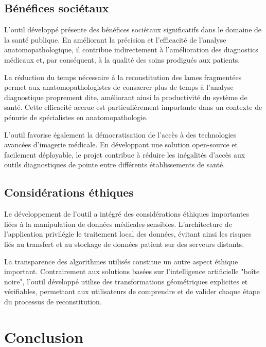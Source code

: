 \documentclass[12pt,a4paper]{report}
\let\oldchapter\chapter
\renewcommand{\chapter}{\clearpage\oldchapter}
\begin{document}
\section{Bénéfices sociétaux}

L'outil développé présente des bénéfices sociétaux significatifs dans le domaine de la santé publique. En améliorant la précision et l'efficacité de l'analyse anatomopathologique, il contribue indirectement à l'amélioration des diagnostics médicaux et, par conséquent, à la qualité des soins prodigués aux patients.

La réduction du temps nécessaire à la reconstitution des lames fragmentées permet aux anatomopathologistes de consacrer plus de temps à l'analyse diagnostique proprement dite, améliorant ainsi la productivité du système de santé. Cette efficacité accrue est particulièrement importante dans un contexte de pénurie de spécialistes en anatomopathologie.

L'outil favorise également la démocratisation de l'accès à des technologies avancées d'imagerie médicale. En développant une solution open-source et facilement déployable, le projet contribue à réduire les inégalités d'accès aux outils diagnostiques de pointe entre différents établissements de santé.

\section{Considérations éthiques}

Le développement de l'outil a intégré des considérations éthiques importantes liées à la manipulation de données médicales sensibles. L'architecture de l'application privilégie le traitement local des données, évitant ainsi les risques liés au transfert et au stockage de données patient sur des serveurs distants.

La transparence des algorithmes utilisés constitue un autre aspect éthique important. Contrairement aux solutions basées sur l'intelligence artificielle "boîte noire", l'outil développé utilise des transformations géométriques explicites et vérifiables, permettant aux utilisateurs de comprendre et de valider chaque étape du processus de reconstitution.

\chapter{Conclusion}

\clearpage

\vspace{0.5em}
\end{document}
